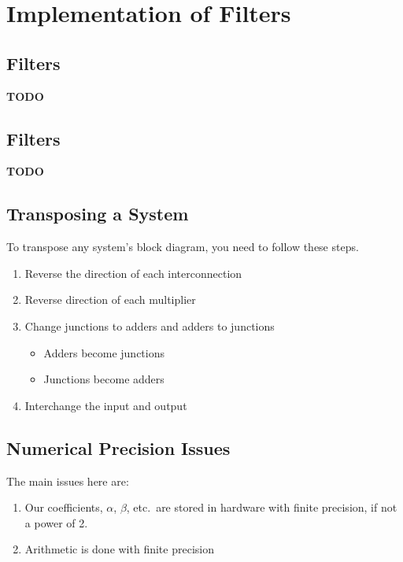 \section{Implementation of Filters}\label{sec:Filter_Implementation}
\subsection{ Filters}\label{subsec:Filter_Implementation-FIR}
\textbf{TODO}

\subsection{ Filters}\label{subsec:Filter_Implementation-IIR}
\textbf{TODO}

\subsection{Transposing a System}\label{subsec:Filter_Implementation-Transposing_System}
To transpose any system's block diagram, you need to follow these steps.
\begin{enumerate}[noitemsep]
\item Reverse the direction of each interconnection
\item Reverse direction of each multiplier
\item Change junctions to adders and adders to junctions
  \begin{itemize}[noitemsep]
  \item Adders become junctions
  \item Junctions become adders
  \end{itemize}
\item Interchange the input and output
\end{enumerate}

\subsection{Numerical Precision Issues}\label{subsec:Filter_Implementation-Numerical_Precision_Issues}
The main issues here are:
\begin{enumerate}[noitemsep]
\item Our coefficients, $\alpha$, $\beta$, etc.\ are stored in hardware with finite precision, if not a power of 2.
\item Arithmetic is done with finite precision
\end{enumerate}

